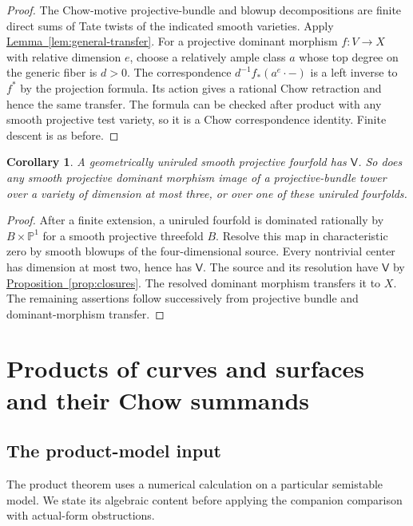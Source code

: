 \documentclass[11pt,a4paper]{article}
\newtheorem{corollary}[theorem]{Corollary}
\theoremstyle{definition}
\theoremstyle{remark}\newtheorem{remark}[theorem]{Remark}
\numberwithin{equation}{section}
\newcommand{\PP}{\mathbb P}\newcommand{\LL}{\mathbb L}
\newcommand{\propref}[1]{\hyperref[#1]{\textcolor{resultlink}{Proposition~\ref*{#1}}}}
\newcommand{\lemref}[1]{\hyperref[#1]{\textcolor{resultlink}{Lemma~\ref*{#1}}}}
\begin{document}
\begin{proof}
The Chow-motive projective-bundle and blowup decompositions are
finite direct sums of Tate twists of the indicated smooth varieties.
Apply \lemref{lem:general-transfer}. For a projective dominant
morphism $f:V\to X$ with relative dimension $e$, choose a relatively
ample class $a$ whose top degree on the generic fiber is $d>0$.
The correspondence $d^{-1}f_*(a^e\cdot-)$ is a left inverse to
$f^*$ by the projection formula. Its action gives a rational Chow
retraction and hence the same transfer. The formula can be checked
after product with any smooth projective test variety, so it is a
Chow correspondence identity. Finite descent is as before.
\end{proof}

\begin{corollary}\label{cor:uniruled}
A geometrically uniruled smooth projective fourfold has $\mathsf V$.
So does any smooth projective dominant morphism image of a
projective-bundle tower over a variety of dimension at most three,
or over one of these uniruled fourfolds.
\end{corollary}

\begin{proof}
After a finite extension, a uniruled fourfold is dominated rationally
by $B\times\PP^1$ for a smooth projective threefold $B$. Resolve this
map in characteristic zero by smooth blowups of the four-dimensional
source. Every nontrivial center has dimension at most two, hence has
$\mathsf V$. The source and its resolution have $\mathsf V$ by
\propref{prop:closures}. The resolved dominant morphism transfers it
to $X$. The remaining assertions follow successively from projective
bundle and dominant-morphism transfer.
\end{proof}



\section{Products of curves and surfaces and their Chow summands}\label{sec:products}

\subsection{The product-model input}

The product theorem uses a numerical calculation on a particular
semistable model. We state its algebraic content before applying the
companion comparison with actual-form obstructions.
\end{document}
